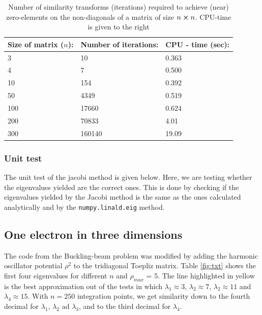 \documentclass{article}
\begin{document}
\begin{table}[h]
\begin{tabular}{lll}
\hline
\textbf{Size of matrix ($n$):} & \textbf{Number of iterations:} & \textbf{CPU - time (sec):} \\ \hline
3                             & 10                            & 0.363                     \\
4                             & 7                             & 0.500                     \\
10                            & 154                           & 0.392                     \\
50                            & 4349                          & 0.519                     \\
100                           & 17660                         & 0.624                     \\
200                           & 70833                         & 4.01                      \\
300                           & 160140                        & 19.09               \\     
\hline
\end{tabular}
\label{tab:1}
\caption{Number of similarity transforms (iterations) required to achieve (near) zero-elements on the non-diagonals of a matrix of size $n\cross n$. CPU-time is given to the right}
\end{table}

\subsubsection{Unit test}

The unit test of the jacobi method is given below. Here, we are testing whether the eigenvalues yielded are the correct ones. This is done by checking if the eigenvalues yielded by the Jacobi method is the same as the ones calculated analytically and by the \texttt{numpy.linald.eig} method. 



\subsection{One electron in three dimensions}

The code from the Buckling-beam problem was modified by adding the harmonic oscillator potential $\rho^2$ to the tridiagonal Toepliz matrix. Table \ref{fig:txt} shows the first four eigenvalues for different $n$ and $\rho_{max}$ = 5. The line highlighted in yellow is the best approximation out of the tests in which $\lambda_1 \approx 3$, $\lambda_2 \approx 7$, $\lambda_2 \approx 11$ and $\lambda_4 \approx 15$. With $n = 250$ integration points, we get similarity down to the fourth decimal for $\lambda_1$, $\lambda_2$ ad $\lambda_3$, and to the third decimal for $\lambda_4$.
\end{document}
